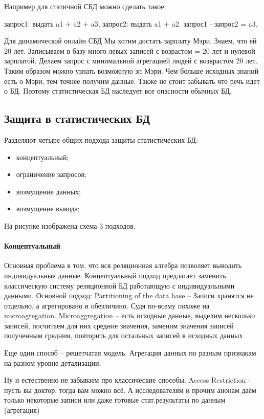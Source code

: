 Например для статичной СБД можно сделать такое

запрос1: выдать a1 + a2 + a3, запрос2: выдать a1 + a2. запрос1 - запрос2 = a3.

Для динамической онлайн СБД
Мы хотим достать зарплату Мэри. Знаем, что ей 20 лет. Записываем в базу много левых записей с возрастом = 20 лет и нулевой зарплатой. Делаем запрос с минимальной агрегацией людей с возврастом 20 лет. Таким образом можно узнать возможную зп Мэри. Чем больше исходных знаний есть о Мэри, тем точнее получим данные.
Также не стоит забывать что речь идет о БД. Поэтому статистическая БД наследует все опасности обычных БД.

  \subsection{Защита в статистических БД}

Разделяют четыре общих подхода защиты статистических БД:
\begin{itemize}
  \item концептуальный;
	\item ограничение запросов;
	\item возмущение данных;
	\item возмущение вывода;
\end{itemize}
На рисунке изображена схема 3 подходов.

\paragraph{Концептуальный}

Основная проблема в том, что вся реляционная алгебра позволяет выводить индивидуальные данные. Концептуальный подход предлагает заменить классическую систему реляционной БД работающую с индивидуальными данными.
Основной подход:
Partitioning of the data base -- Записи хранятся не отдельно, а агрегировано и обезличино. Судя по-всему похоже на microagregation.
Microaggregation -- есть исходные данные, выделим несколько записей, посчитаем для них средние значения, заменим значения записей полученным средним, повторить для остальных записей в исходных данных

Еще один способ -- решетчатая модель. Агрегация данных по разным признакам на разном уровне детализации.

Ну и естественно не забываем про классические способы.
Access Restriction - пусть вы доктор, тогда вам можно всё. А исследователям и прочим анонам даём только некоторые записи или даже готовые стат.результаты по данным (агрегация)


